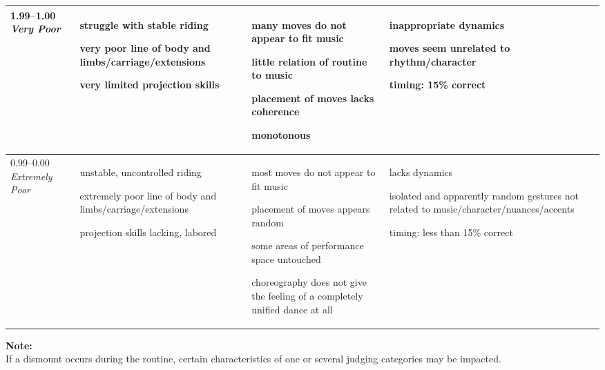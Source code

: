 \begin{longtable}{|p{1.5cm}|p{5.5cm}|p{5.5cm}|p{5.5cm}|}
1.99--1.00 \newline
\emph{Very Poor} &

\begin{judging_items}%
\item struggle with stable riding
\item very poor line of body and limbs/carriage/extensions
\item very limited projection skills 
\end{judging_items} &

\begin{judging_items}%
\item many moves do not appear to fit music
\item little relation of routine to music
\item placement of moves lacks coherence
\item monotonous 
\end{judging_items} &

\begin{judging_items}%
\item inappropriate dynamics
\item moves seem unrelated to rhythm/character
\item timing: 15\% correct
\end{judging_items} \\
\hline

0.99--0.00 \newline
\emph{Extremely Poor} &

\begin{judging_items}%
\item unstable, uncontrolled riding
\item extremely poor line of body and limbs/carriage/extensions
\item projection skills lacking, labored
\end{judging_items} &

\begin{judging_items}%
\item most moves do not appear to fit music
\item placement of moves appears random
\item some areas of performance space untouched
\item choreography does not give the feeling of a completely unified dance at all
\end{judging_items} &

\begin{judging_items}%
\item lacks dynamics
\item isolated and apparently random gestures not related to music/character/nuances/accents
\item timing: less than 15\% correct
\end{judging_items} \\
\hline

\end{longtable}
\endgroup

\textbf{Note:} \\
If a dismount occurs during the routine, certain characteristics of one or several judging categories may be impacted. 
